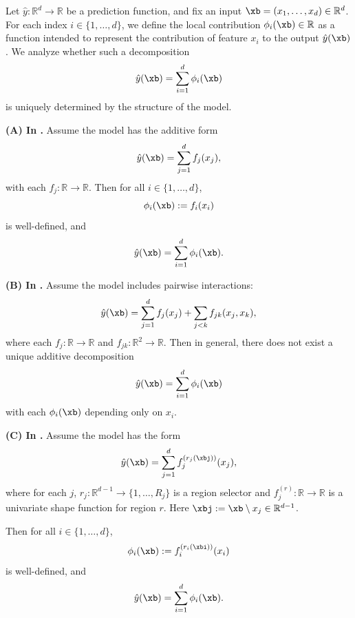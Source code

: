 \begin{proposition}

Let \( \hat{y} : \mathbb{R}^d \to \mathbb{R} \) be a prediction function, and fix an input \( \xb = (x_1, \dots, x_d) \in \mathbb{R}^d \). For each index \( i \in \{1, \dots, d\} \), we define the local contribution \( \phi_i(\xb) \in \mathbb{R} \) as a function intended to represent the contribution of feature \( x_i \) to the output \( \hat{y}(\xb) \). We analyze whether such a decomposition
\[
\hat{y}(\xb) = \sum_{i=1}^d \phi_i(\xb)
\]
is uniquely determined by the structure of the model.

\textbf{(A) In \gam.}
Assume the model has the additive form
\[
\hat{y}(\xb) = \sum_{j=1}^d f_j(x_j),
\]
with each \( f_j : \mathbb{R} \to \mathbb{R} \). Then for all \( i \in \{1, \dots, d\} \),
\[
\phi_i(\xb) := f_i(x_i)
\]
is well-defined, and
\[
\hat{y}(\xb) = \sum_{i=1}^d \phi_i(\xb).
\]

\textbf{(B) In \gamm.}
Assume the model includes pairwise interactions:
\[
\hat{y}(\xb) = \sum_{j=1}^d f_j(x_j) + \sum_{j<k} f_{jk}(x_j, x_k),
\]
where each \( f_j : \mathbb{R} \to \mathbb{R} \) and \( f_{jk} : \mathbb{R}^2 \to \mathbb{R} \). Then in general, there does not exist a unique additive decomposition
\[
\hat{y}(\xb) = \sum_{i=1}^d \phi_i(\xb)
\]
with each \( \phi_i(\xb) \) depending only on \( x_i \).

\textbf{(C) In \method{}.}
Assume the model has the form
\[
\hat{y}(\xb) = \sum_{j=1}^d f_j^{(r_j(\xbj))}(x_j),
\]
where for each \( j \), \( r_j : \mathbb{R}^{d-1} \to \{1, \dots, R_j\} \) is a region selector and \( f_j^{(r)} : \mathbb{R} \to \mathbb{R} \) is a univariate shape function for region \( r \). Here \( \xbj := \xb \setminus x_j \in \mathbb{R}^{d-1} \).

Then for all \( i \in \{1, \dots, d\} \),
\[
\phi_i(\xb) := f_i^{(r_i(\xbi))}(x_i)
\]
is well-defined, and
\[
\hat{y}(\xb) = \sum_{i=1}^d \phi_i(\xb).
\]
\end{proposition}

